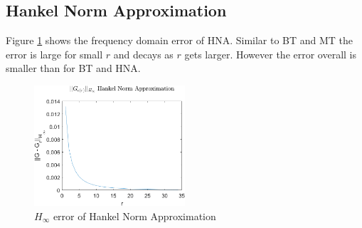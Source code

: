 \subsection{Hankel Norm Approximation}
Figure \ref{FIG-H-HNA} shows the frequency domain error of HNA.
Similar to BT and MT the error is large for small \(r\) and decays as \(r\) gets larger.
However the error overall is smaller than for BT and HNA.
\begin{figure}[H]
\centering
\includegraphics[width=0.5\textwidth]{images/freq/H_HNA}
\caption{$H_{\infty}$ error of Hankel Norm Approximation}
\label{FIG-H-HNA}
\end{figure}


